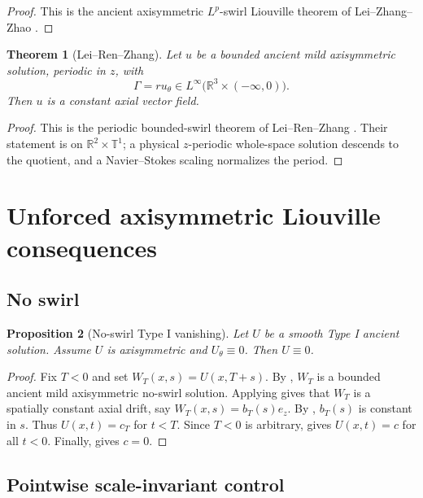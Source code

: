 \documentclass[11pt]{amsart}
\theoremstyle{plain}
\newtheorem{theorem}{Theorem}[section]
\newtheorem{proposition}[theorem]{Proposition}
\theoremstyle{definition}
\theoremstyle{remark}
\numberwithin{equation}{section}
\begin{document}
\begin{proof}
This is the ancient axisymmetric \(L^p\)-swirl Liouville theorem of
Lei--Zhang--Zhao \cite{LZZ}.
\end{proof}

\begin{theorem}[Lei--Ren--Zhang]
\label{thm:lrz}
Let \(u\) be a bounded ancient mild axisymmetric solution, periodic in \(z\),
with
\[
   \Gamma=ru_\theta\in L^\infty
   \bigl(\mathbb R^3\times(-\infty,0)\bigr).
\]
Then \(u\) is a constant axial vector field.
\end{theorem}

\begin{proof}
This is the periodic bounded-swirl theorem of Lei--Ren--Zhang
\cite{LRZ}.  Their statement is on \(\mathbb R^2\times\mathbb T^1\); a
physical \(z\)-periodic whole-space solution descends to the quotient, and a
Navier--Stokes scaling normalizes the period.
\end{proof}

\section{Unforced axisymmetric Liouville consequences}
\label{sec:axisymmetric-consequences}

\subsection{No swirl}

\begin{proposition}[No-swirl Type I vanishing]\label{prop:noswirl-typeI}
Let \(U\) be a smooth Type I ancient solution.  Assume \(U\) is axisymmetric
and \(U_\theta\equiv0\).  Then \(U\equiv0\).
\end{proposition}

\begin{proof}
Fix \(T<0\) and set \(W_T(x,s)=U(x,T+s)\).  By ,
\(W_T\) is a bounded ancient mild axisymmetric no-swirl solution.  Applying
 gives that \(W_T\) is a spatially constant axial
drift, say \(W_T(x,s)=b_T(s)e_z\).  By
, \(b_T(s)\) is constant in \(s\).  Thus
\(U(x,t)=c_T\) for \(t<T\).  Since \(T<0\) is arbitrary,
 gives \(U(x,t)=c\) for all \(t<0\).  Finally,
 gives \(c=0\).
\end{proof}

\subsection{Pointwise scale-invariant control}
\end{document}
